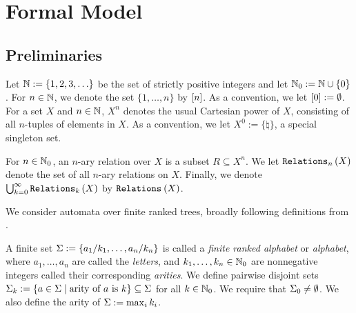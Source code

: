 \section{Formal Model}\label{sec:formalModel-trees}

\subsection{Preliminaries}\label{subsec:preliminaries}

Let $\N := \set{1, 2, 3, \dots}$ be the set of strictly positive integers and let $\N_0 := \N \cup \{0\}$. For $n \in \N$, we denote the set $\{1, \ldots, n\}$ by $\counting{n}$. As a convention, we let $\counting{0} := \emptyset$. For a set $X$ and $n \in \N$, $X^n$ denotes the usual Cartesian power of $X$, consisting of all $n$-tuples of elements in $X$. As a convention, we let $X^0 := \{\natural\}$, a special singleton set.


For $n \in \N_0$, an $n$-ary relation over $X$ is a subset $R \subseteq X^n$. We let $\relations{X}{n}$ denote the set of all $n$-ary relations on $X$. Finally, we denote $\bigcup_{k=0}^\infty \relations{X}{k}$ by $\relations{X}{}$.


We consider automata over finite ranked trees, broadly following definitions from \cite{tata}.

\begin{definition}[Alphabet]\label{def:alphabet}
    A finite set $\alphabet := \{a_1/k_1, \dots, a_n/k_n\}$ is called a \emph{finite ranked alphabet} or \emph{alphabet}, where $a_1, \dots, a_n$ are called the \emph{letters}, and $k_1, \dots, k_n \in \N_0$ are nonnegative integers called their corresponding \emph{arities}. We define pairwise disjoint sets $\alphabet_k := \{a \in \alphabet \mid \mbox{arity of $a$ is $k$}\} \subseteq \alphabet$ for all $k \in \N_0$. We require that $\alphabet_0 \neq \emptyset$. We also define the arity of $\alphabet := \max_{i} k_i$.
\end{definition}

